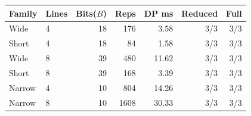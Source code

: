 \begin{tabular}{llrrrrr}
\toprule
Family & Lines & Bits($B$) & Reps & DP ms & Reduced & Full \\
\midrule
Wide & 4 & 18 & 176 & 3.58 & 3/3 & 3/3 \\
Short & 4 & 18 & 84 & 1.58 & 3/3 & 3/3 \\
Wide & 8 & 39 & 480 & 11.62 & 3/3 & 3/3 \\
Short & 8 & 39 & 168 & 3.39 & 3/3 & 3/3 \\
Narrow & 4 & 10 & 804 & 14.26 & 3/3 & 3/3 \\
Narrow & 8 & 10 & 1608 & 30.33 & 3/3 & 3/3 \\
\bottomrule
\end{tabular}